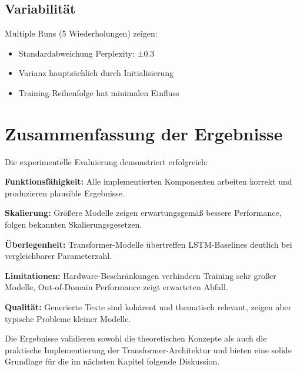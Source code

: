 \subsection{Variabilität}

Multiple Runs (5 Wiederholungen) zeigen:
\begin{itemize}
    \item Standardabweichung Perplexity: ±0.3
    \item Varianz hauptsächlich durch Initialisierung
    \item Training-Reihenfolge hat minimalen Einfluss
\end{itemize}

\section{Zusammenfassung der Ergebnisse}

Die experimentelle Evaluierung demonstriert erfolgreich:

\textbf{Funktionsfähigkeit:} Alle implementierten Komponenten arbeiten korrekt und produzieren plausible Ergebnisse.

\textbf{Skalierung:} Größere Modelle zeigen erwartungsgemäß bessere Performance, folgen bekannten Skalierungsgesetzen.

\textbf{Überlegenheit:} Transformer-Modelle übertreffen LSTM-Baselines deutlich bei vergleichbarer Parameterzahl.

\textbf{Limitationen:} Hardware-Beschränkungen verhindern Training sehr großer Modelle, Out-of-Domain Performance zeigt erwarteten Abfall.

\textbf{Qualität:} Generierte Texte sind kohärent und thematisch relevant, zeigen aber typische Probleme kleiner Modelle.

Die Ergebnisse validieren sowohl die theoretischen Konzepte als auch die praktische Implementierung der Transformer-Architektur und bieten eine solide Grundlage für die im nächsten Kapitel folgende Diskussion.